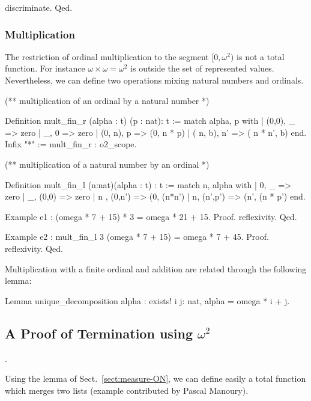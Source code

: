 \begin{Coqsrc}
 discriminate.
Qed.
\end{Coqsrc}


\subsubsection{Multiplication}

The restriction of ordinal multiplication to the segment $[0,\omega^2)$ is not a total function.
For instance $\omega\times\omega= \omega^2$ is outside the set of represented values.
Nevertheless, we can define two operations mixing natural numbers and ordinals.

\begin{Coqsrc}
(** multiplication of an ordinal by a natural number *)

Definition mult_fin_r  (alpha : t) (p : nat): t :=
  match alpha, p with
 |  (0,0), _  => zero
 |  _, 0 => zero
 |  (0, n), p => (0, n * p)
 |  ( n, b),  n' => ( n *  n', b)
 end.
Infix "*" := mult_fin_r : o2_scope.

(** multiplication of  a natural number by an ordinal *)

Definition mult_fin_l (n:nat)(alpha : t) : t :=
  match n, alpha with
 |  0, _  => zero
 |  _, (0,0) => zero
 |   n , (0,n') => (0, (n*n')%
 |  n, (n',p') => (n', (n * p')%
 end.

Example e1 : (omega * 7 + 15) * 3 = omega * 21 + 15.
Proof. reflexivity. Qed.

Example e2 :  mult_fin_l 3 (omega * 7 + 15) = omega * 7 + 45.
Proof. reflexivity. Qed.
\end{Coqsrc}

Multiplication with a finite ordinal and addition are related through the following lemma:

\begin{Coqsrc}
Lemma unique_decomposition alpha : 
    exists! i j: nat,  alpha = omega * i + j.
\end{Coqsrc}

\subsection{A Proof of Termination using \texorpdfstring{$\omega^2$}{omega^2}} 
\label{sect:merge-example}.

Using the lemma of Sect.~\vref{sect:measure-ON}, we can define easily a total function which merges two lists (example contributed by Pascal Manoury).


